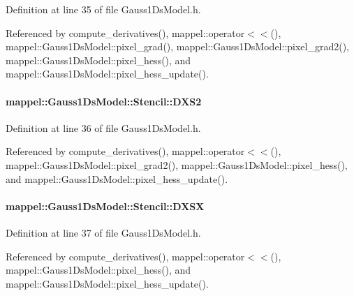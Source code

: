 Definition at line 35 of file Gauss1\+Ds\+Model.\+h.



Referenced by compute\+\_\+derivatives(), mappel\+::operator$<$$<$(), mappel\+::\+Gauss1\+Ds\+Model\+::pixel\+\_\+grad(), mappel\+::\+Gauss1\+Ds\+Model\+::pixel\+\_\+grad2(), mappel\+::\+Gauss1\+Ds\+Model\+::pixel\+\_\+hess(), and mappel\+::\+Gauss1\+Ds\+Model\+::pixel\+\_\+hess\+\_\+update().

\paragraph[{\texorpdfstring{D\+X\+S2}{DXS2}}]{ mappel\+::\+Gauss1\+Ds\+Model\+::\+Stencil\+::\+D\+X\+S2}\hypertarget{classmappel_1_1Gauss1DsModel_1_1Stencil_a846e15fa6424d1b9193acc3c09887e89}{}\label{classmappel_1_1Gauss1DsModel_1_1Stencil_a846e15fa6424d1b9193acc3c09887e89}


Definition at line 36 of file Gauss1\+Ds\+Model.\+h.



Referenced by compute\+\_\+derivatives(), mappel\+::operator$<$$<$(), mappel\+::\+Gauss1\+Ds\+Model\+::pixel\+\_\+grad2(), mappel\+::\+Gauss1\+Ds\+Model\+::pixel\+\_\+hess(), and mappel\+::\+Gauss1\+Ds\+Model\+::pixel\+\_\+hess\+\_\+update().

\paragraph[{\texorpdfstring{D\+X\+SX}{DXSX}}]{ mappel\+::\+Gauss1\+Ds\+Model\+::\+Stencil\+::\+D\+X\+SX}\hypertarget{classmappel_1_1Gauss1DsModel_1_1Stencil_ad89b7a15072ed14bd773ffce986f2e95}{}\label{classmappel_1_1Gauss1DsModel_1_1Stencil_ad89b7a15072ed14bd773ffce986f2e95}


Definition at line 37 of file Gauss1\+Ds\+Model.\+h.



Referenced by compute\+\_\+derivatives(), mappel\+::operator$<$$<$(), mappel\+::\+Gauss1\+Ds\+Model\+::pixel\+\_\+hess(), and mappel\+::\+Gauss1\+Ds\+Model\+::pixel\+\_\+hess\+\_\+update().

